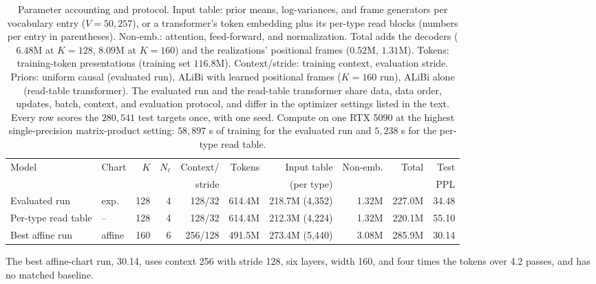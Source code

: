 \documentclass[twoside,11pt]{article}
\begin{document}
\begin{table}[tbp]
\centering
\footnotesize
\setlength{\tabcolsep}{3.5pt}
\begin{tabular}{@{}llrrrrrrrr@{}}
\toprule
Model & Chart & $K$ & $N_\ell$ & Context/ & Tokens & Input table & Non-emb. & Total & Test \\
      &       &     &           & stride   &        & (per type)  &          &       & PPL  \\
\midrule
Evaluated run & exp. & 128 & 4 & 128/32 & 614.4M & 218.7M (4{,}352) & 1.32M & 227.0M & 34.48 \\
Per-type read table & -- & 128 & 4 & 128/32 & 614.4M & 212.3M (4{,}224) & 1.32M & 220.1M & 55.10 \\ %
\midrule
Best affine run & affine & 160 & 6 & 256/128 & 491.5M & 273.4M (5{,}440) & 3.08M & 285.9M & 30.14 \\ %
\bottomrule
\end{tabular}
\caption{Parameter accounting and protocol. Input table: prior means, log-variances, and frame generators per vocabulary entry ($V=50{,}257$), or a transformer's token embedding plus its per-type read blocks (numbers per entry in parentheses). Non-emb.: attention, feed-forward, and normalization. Total adds the decoders ($6.48$M at $K=128$, $8.09$M at $K=160$) and the realizations' positional frames ($0.52$M, $1.31$M). Tokens: training-token presentations (training set $116.8$M). Context/stride: training context, evaluation stride. Priors: uniform causal (evaluated run), ALiBi with learned positional frames ($K=160$ run), ALiBi alone (read-table transformer). The evaluated run and the read-table transformer share data, data order, updates, batch, context, and evaluation protocol, and differ in the optimizer settings listed in the text. Every row scores the $280{,}541$ test targets once, with one seed. Compute on one RTX 5090 at the highest single-precision matrix-product setting: $58{,}897$ s of training for the evaluated run and $5{,}238$ s for the per-type read table.}
\label{tab:param_accounting}
\end{table}

The best affine-chart run, 30.14, uses context 256 with stride 128, six layers, width 160, and four times the tokens over 4.2 passes, and has no matched baseline.
\end{document}
